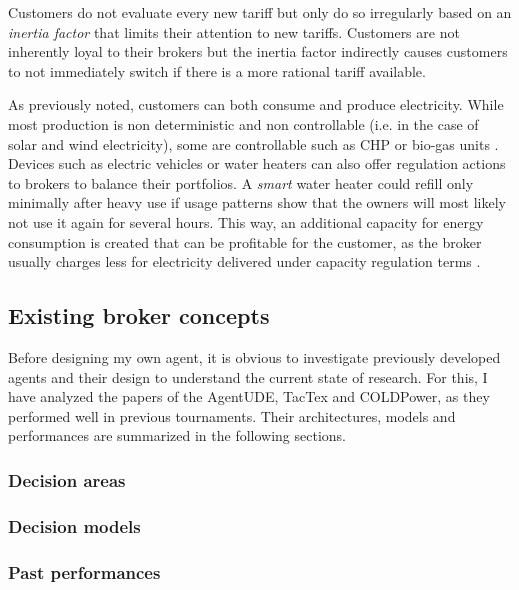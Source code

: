 Customers do not evaluate every new tariff but only do so irregularly based on an \emph{inertia factor} that limits
their attention to new tariffs. Customers are not inherently loyal to their brokers but the inertia factor
indirectly causes customers to not immediately switch if there is a more rational tariff available.

As previously noted, customers can both consume and produce electricity. While most production is non deterministic
and non controllable (i.e. in the case of solar and wind electricity), some are controllable such as \ac{CHP} or
bio-gas units \citep[p.16]{ketter2018powertac}. Devices such as electric vehicles or water heaters can also offer
regulation actions to brokers to balance their portfolios. A \emph{smart} water heater could refill only minimally
after heavy use if usage patterns show that the owners will most likely not use it again for several hours. This
way, an additional capacity for energy consumption is created that can be profitable for the customer, as the broker
usually charges less for electricity delivered under capacity regulation terms \citep[p.14ff.]{ketter2018powertac}.

\subsection{Existing broker concepts}%
\label{sub:existing_broker_concepts}
Before designing my own agent, it is obvious to investigate previously developed agents and their design to understand
the current state of research. For this, I have analyzed the papers of the AgentUDE, TacTex and COLDPower, as they
performed well in previous tournaments. Their architectures, models and performances are summarized in the following
sections.

\subsubsection{Decision areas}%
\label{ssub:decision_areas}



\subsubsection{Decision models}%
\label{ssub:decision_models}

\subsubsection{Past performances}%
\label{ssub:past_performances}

